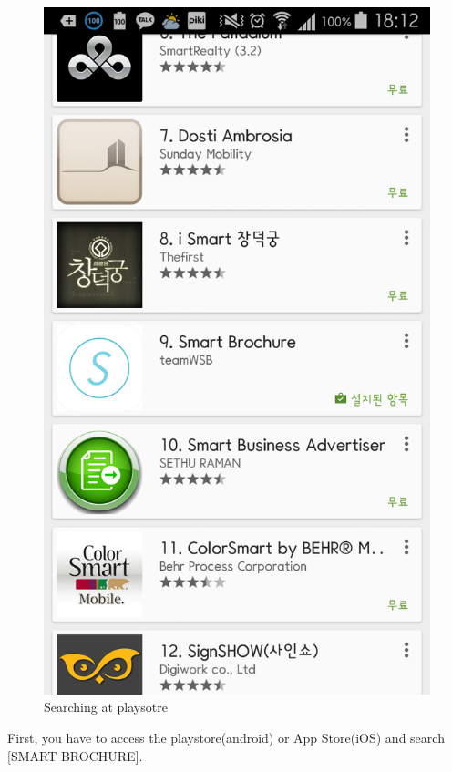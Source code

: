 \documentclass[conference]{IEEEtran}
\begin{document}
\begin{figure}[htbp]
\begin{center}
    \includegraphics[scale=0.18]{img_install01}
    \caption{Searching at playsotre} 
\end{center}
\end{figure}

First, you have to access the playstore(android) or App Store(iOS) and search [SMART BROCHURE]. \\
\end{document}
